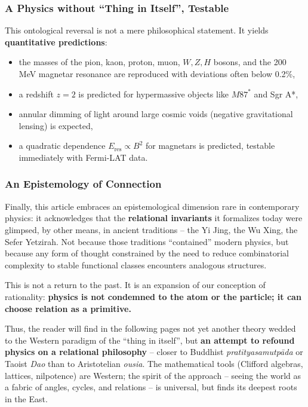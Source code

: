\documentclass[11pt]{article}
\providecommand{\tightlist}{\setlength{\itemsep}{2pt}\setlength{\parskip}{6pt}}
\providecommand{\tightlist}{%
  \setlength{\itemsep}{2pt}\setlength{\parskip}{6pt}
}
\begin{document}
\hypertarget{a-physics-without-thing-in-itself-testable}{%
\subsubsection{A Physics without ``Thing in Itself'',
Testable}\label{a-physics-without-thing-in-itself-testable}}

This ontological reversal is not a mere philosophical statement. It
yields \textbf{quantitative predictions}:

\begin{itemize}
\tightlist
\item
  the masses of the pion, kaon, proton, muon, \(W, Z, H\) bosons, and
  the 200 MeV magnetar resonance are reproduced with deviations often
  below 0.2\%,
\item
  a redshift \(z = 2\) is predicted for hypermassive objects like
  \(M87^*\) and Sgr A*,
\item
  annular dimming of light around large cosmic voids (negative
  gravitational lensing) is expected,
\item
  a quadratic dependence \(E_{\text{res}} \propto B^2\) for magnetars is
  predicted, testable immediately with Fermi-LAT data.
\end{itemize}

\hypertarget{an-epistemology-of-connection}{%
\subsubsection{An Epistemology of
Connection}\label{an-epistemology-of-connection}}

Finally, this article embraces an epistemological dimension rare in
contemporary physics: it acknowledges that the \textbf{relational
invariants} it formalizes today were glimpsed, by other means, in
ancient traditions -- the Yi Jing, the Wu Xing, the Sefer Yetzirah. Not
because those traditions ``contained'' modern physics, but because any
form of thought constrained by the need to reduce combinatorial
complexity to stable functional classes encounters analogous structures.

This is not a return to the past. It is an expansion of our conception
of rationality: \textbf{physics is not condemned to the atom or the
particle; it can choose relation as a primitive.}

Thus, the reader will find in the following pages not yet another theory
wedded to the Western paradigm of the ``thing in itself'', but
\textbf{an attempt to refound physics on a relational philosophy} --
closer to Buddhist \emph{pratītyasamutpāda} or Taoist \emph{Dao} than to
Aristotelian \emph{ousia}. The mathematical tools (Clifford algebras,
lattices, nilpotence) are Western; the spirit of the approach -- seeing
the world as a fabric of angles, cycles, and relations -- is universal,
but finds its deepest roots in the East.
\end{document}
